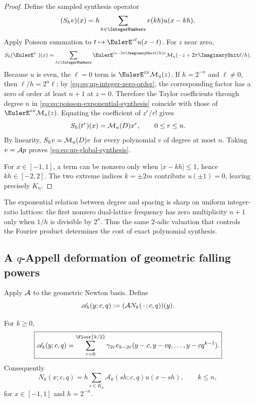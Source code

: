 \begin{proof}
Define the sampled synthesis operator
\[
 (S_hv)(x)=h\sum_{k\in\IntegerNumbers}v(kh)u(x-kh).
\]
Apply Poisson summation to $t\mapsto\EulerE^{zt}u(x-t)$.  For $z$ near zero,
\begin{equation}
 S_h(\EulerE^{z\,\cdot})(x)
 =\sum_{\ell\in\IntegerNumbers}
   \EulerE^{(z-2\pi\ImaginaryUnit\ell/h)x}
   \MGF_u(-z+2\pi\ImaginaryUnit\ell/h).
 \label{gq:eq:poisson-exponential-synthesis}
\end{equation}
Because $u$ is even, the $\ell=0$ term is
$\EulerE^{zx}\MGF_u(z)$.  If $h=2^{-n}$ and $\ell\ne0$, then
$\ell/h=2^n\ell$; by \eqref{gq:eq:up-integer-zero-order}, the corresponding
factor has a zero of order at least $n+1$ at $z=0$.  Therefore the Taylor
coefficients through degree $n$ in \eqref{gq:eq:poisson-exponential-synthesis}
coincide with those of $\EulerE^{zx}\MGF_u(z)$.  Equating the coefficient of
$z^r/r!$ gives
\begin{equation}
 S_h(t^r)(x)=\mathcal M_u(D)x^r,
 \qquad 0\le r\le n.
 \label{gq:eq:sampled-moment-operator}
\end{equation}
By linearity, $S_hv=\mathcal M_u(D)v$ for every polynomial $v$ of degree at most
$n$.  Taking $v=\mathcal A p$ proves \eqref{gq:eq:up-global-synthesis}.

For $x\in[-1,1]$, a term can be nonzero only when
$|x-kh|\le1$, hence $kh\in[-2,2]$.  The two extreme indices
$k=\pm2m$ contribute $u(\pm1)=0$, leaving precisely $K_n$.
\end{proof}

The exponential relation between degree and spacing is sharp on uniform
integer-ratio lattices: the first nonzero dual-lattice frequency has zero
multiplicity $n+1$ only when $1/h$ is divisible by $2^n$.  Thus the same
$2$-adic valuation that controls the Fourier product determines the cost of
exact polynomial synthesis.

\subsection{A \texorpdfstring{$q$}{q}-Appell deformation of geometric falling powers}

Apply $\mathcal A$ to the geometric Newton basis.  Define
\begin{equation}
 \mathscr A_k(y;c,q):=(\mathcal A N_k(\,\cdot\,;c,q))(y).
 \label{gq:eq:q-Appell-falling-definition}
\end{equation}

\begin{proposition}
\label{gq:prop:q-Appell-falling}
For $k\ge0$,
\begin{equation}
 \boxed{
 \mathscr A_k(y;c,q)
 =\sum_{r=0}^{\Floor{k/2}}\gamma_{2r}
 e_{k-2r}(y-c,y-cq,\ldots,y-cq^{k-1}).}
 \label{gq:eq:q-Appell-falling}
\end{equation}
Consequently
\begin{equation}
 N_k(x;c,q)
 =h\sum_{s\in K_n}\mathscr A_k(sh;c,q)u(x-sh),
 \qquad k\le n,
 \label{gq:eq:q-falling-up-synthesis}
\end{equation}
for $x\in[-1,1]$ and $h=2^{-n}$.
\end{proposition}

